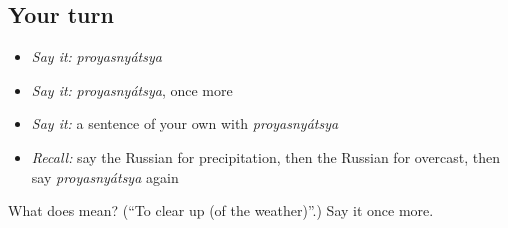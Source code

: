 \subsection*{Your turn}
\begin{itemize}
\raggedright
  \item \emph{Say it:} \emph{proyasnyátsya}
  \item \emph{Say it:} \emph{proyasnyátsya}, once more
  \item \emph{Say it:} a sentence of your own with \emph{proyasnyátsya}
  \item \emph{Recall:} say the Russian for precipitation, then the Russian for overcast, then say \emph{proyasnyátsya} again
\end{itemize}

\begin{tcolorbox}[breakable,colback=teal!4,colframe=teal!35!black,title={Before you move on}]
What does  mean? (\textquotedblleft{}To clear up (of the weather)\textquotedblright{}.) Say it once more.
\end{tcolorbox}
